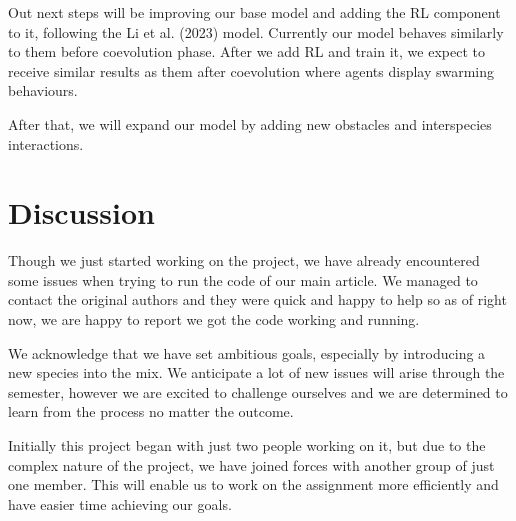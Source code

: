 \documentclass[9pt]{pnas-new}
\begin{document}
Out next steps will be improving our base model and adding the RL component to it, following the Li et al. (2023) model. Currently our model behaves similarly to them before coevolution phase. After we add RL and train it, we expect to receive similar results as them after coevolution where agents display swarming behaviours. 

After that, we will expand our model by adding new obstacles and interspecies interactions. 

\section*{Discussion}
Though we just started working on the project, we have already encountered some issues when trying to run the code of our main article. We managed to contact the original authors and they were quick and happy to help so as of right now, we are happy to report we got the code working and running. 

We acknowledge that we have set ambitious goals, especially by introducing a new species into the mix. We anticipate a lot of new issues will arise through the semester, however we are excited to challenge ourselves and we are determined to learn from the process no matter the outcome.

Initially this project began with just two people working on it, but due to the complex nature of the project, we have joined forces with another group of just one member. This will enable us to work on the assignment more efficiently and have easier time achieving our goals.


\showacknow %


\begin{multicols}{2}
\end{multicols}
\end{document}
